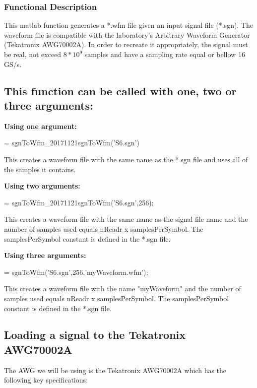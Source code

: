 \subsubsection*{Functional Description}

This matlab function generates a *.wfm file given an input signal file (*.sgn). The waveform file is compatible with the laboratory's Arbitrary Waveform Generator (Tekatronix AWG70002A). In order to recreate it appropriately, the signal must be real, not exceed $8*10^9$ samples and have a sampling rate equal or bellow 16 GS/s.


\subsection*{This function can be called with one, two or three arguments:}
\textbf{Using one argument:}
\bigskip

  = sgnToWfm\_20171121sgnToWfm('S6.sgn')
\bigskip

\noindent
This creates a waveform file with the same name as the *.sgn file and uses all of the samples it contains.
\bigskip

\noindent
\textbf{Using two arguments:}
\bigskip

  = sgnToWfm\_20171121sgnToWfm('S6.sgn',256);
\bigskip

\noindent
This creates a waveform file with the same name as the signal file name and the number of samples used equals nReadr x samplesPerSymbol. The samplesPerSymbol constant is defined in the *.sgn file.
\bigskip

\noindent
\textbf{Using three arguments:}
\bigskip

 = sgnToWfm('S6.sgn',256,'myWaveform.wfm');
\bigskip

\noindent
This creates a waveform file with the name "myWaveform" and the number of samples used equals nReadr x samplesPerSymbol. The samplesPerSymbol constant is defined in the *.sgn file.


\subsection{Loading a signal to the Tekatronix AWG70002A}

The AWG we will be using is the Tekatronix AWG70002A which has the following key specifications:
\bigskip

